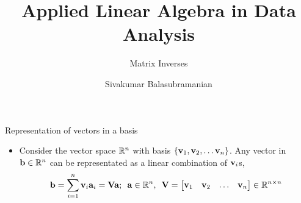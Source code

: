 \documentclass[aspectratio=169]{beamer}
\title{Applied Linear Algebra in Data Analysis}
\subtitle{Matrix Inverses}
\author{Sivakumar Balasubramanian}
\institute[Christian Medical College] %
{
  \inst{}%
  Department of Bioengineering\\
  Christian Medical College, Bagayam\\
  Vellore 632002
}
\date{}
\let\olditem\item
\renewcommand{\item}{\setlength{\itemsep}{\fill}\olditem}
\def\mf{\ensuremath\mathbf}
\def\mb{\ensuremath\mathbb}
\begin{document}
\begin{frame}
  \titlepage
\end{frame}



\begin{frame}[t]{Representation of vectors in a basis}
\begin{itemize}
\item Consider the vector space $\mb{R}^n$ with basis $\left\{\mf{v}_1, \mf{v}_2, \ldots \mf{v}_n\right\}$. Any vector in $\mf{b} \in \mb{R}^n$ can be representated as a linear combination of $\mf{v}_i$s,
\[ \mf{b} = \sum_{i=1}^{n} \mf{v}_i\mf{a}_i = \mf{V}\mf{a}; \,\,\, \mf{a} \in \mb{R}^n, \,\,\, \mf{V} = \begin{bmatrix*}\mf{v}_1 & \mf{v}_2 & \ldots & \mf{v}_n\end{bmatrix*} \in \mb{R}^{n \times n} \]


\end{itemize}
\end{frame}
\end{document}
